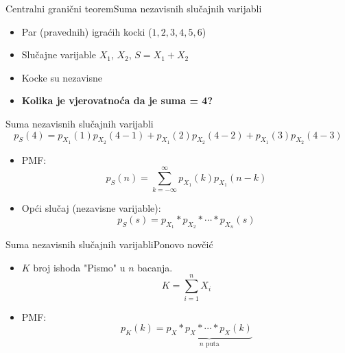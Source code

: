 \documentclass[aspectratio=169]{beamer}
\begin{document}
{

	 {
	}

  \begin{frame}{Centralni granični teorem}{Suma nezavisnih slučajnih varijabli}
    \begin{itemize}
      \item Par (pravednih) igraćih kocki ($1,2,3,4,5,6$)
      \item Slučajne varijable $X_1$, $X_2$, $S=X_1+X_2$
      \item Kocke su nezavisne
      \item \textbf{Kolika je vjerovatnoća da je suma = 4?}
    \end{itemize}
  \end{frame}

}
  
  \begin{frame}{Suma nezavisnih slučajnih varijabli}
    $$p_S(4) = p_{X_1}(1)p_{X_2}(4-1) + p_{X_1}(2)p_{X_2}(4-2) +
      p_{X_1}(3)p_{X_2}(4-3)$$
    \begin{itemize}
      \item PMF:
        $$p_{S}(n) = \sum_{k=-\infty}^{\infty} p_{X_1}(k) p_{X_1}(n-k)$$
      \item Opći slučaj (nezavisne varijable):
        $$p_S(s) = p_{X_1} * p_{X_2} * \cdots * p_{X_n} (s)$$
    \end{itemize}
  \end{frame}

  \begin{frame}{Suma nezavisnih slučajnih varijabli}{Ponovo novčić}
    \begin{itemize}
      \item $K$ broj ishoda "Pismo" u $n$ bacanja.
        $$K = \sum_{i=1}^{n} X_i$$
      \item PMF:
        $$p_K(k) = \underbrace{p_X * p_X * \cdots * p_X (k)}_{n\text{ puta}}$$
    \end{itemize}
  \end{frame}
\end{document}
